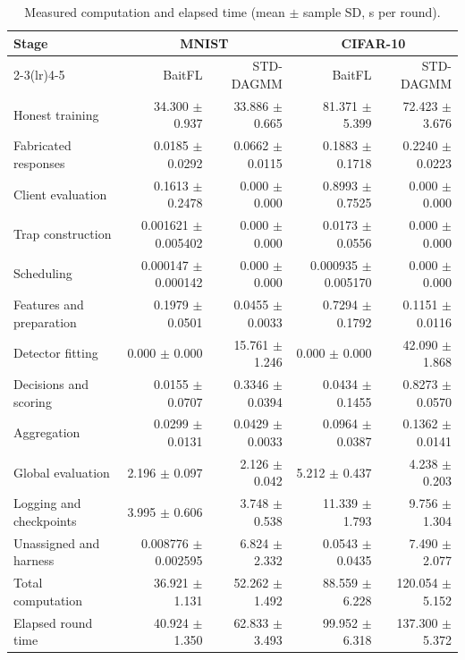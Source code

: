 \begin{table}[t]\centering\footnotesize\setlength{\tabcolsep}{5pt}
\caption{Measured computation and elapsed time (mean $\pm$ sample SD, s per round).}\label{tab:std-segments}
\begin{tabular}{lrrrr}\toprule
\multirow{2}{*}{Stage} & \multicolumn{2}{c}{MNIST} & \multicolumn{2}{c}{CIFAR-10} \\
\cmidrule(lr){2-3}\cmidrule(lr){4-5}
 & BaitFL & STD-DAGMM & BaitFL & STD-DAGMM \\ \midrule
Honest training & 34.300 $\pm$ 0.937 & 33.886 $\pm$ 0.665 & 81.371 $\pm$ 5.399 & 72.423 $\pm$ 3.676 \\
Fabricated responses & 0.0185 $\pm$ 0.0292 & 0.0662 $\pm$ 0.0115 & 0.1883 $\pm$ 0.1718 & 0.2240 $\pm$ 0.0223 \\
Client evaluation & 0.1613 $\pm$ 0.2478 & 0.000 $\pm$ 0.000 & 0.8993 $\pm$ 0.7525 & 0.000 $\pm$ 0.000 \\
Trap construction & 0.001621 $\pm$ 0.005402 & 0.000 $\pm$ 0.000 & 0.0173 $\pm$ 0.0556 & 0.000 $\pm$ 0.000 \\
Scheduling & 0.000147 $\pm$ 0.000142 & 0.000 $\pm$ 0.000 & 0.000935 $\pm$ 0.005170 & 0.000 $\pm$ 0.000 \\
Features and preparation & 0.1979 $\pm$ 0.0501 & 0.0455 $\pm$ 0.0033 & 0.7294 $\pm$ 0.1792 & 0.1151 $\pm$ 0.0116 \\
Detector fitting & 0.000 $\pm$ 0.000 & 15.761 $\pm$ 1.246 & 0.000 $\pm$ 0.000 & 42.090 $\pm$ 1.868 \\
Decisions and scoring & 0.0155 $\pm$ 0.0707 & 0.3346 $\pm$ 0.0394 & 0.0434 $\pm$ 0.1455 & 0.8273 $\pm$ 0.0570 \\
Aggregation & 0.0299 $\pm$ 0.0131 & 0.0429 $\pm$ 0.0033 & 0.0964 $\pm$ 0.0387 & 0.1362 $\pm$ 0.0141 \\
Global evaluation & 2.196 $\pm$ 0.097 & 2.126 $\pm$ 0.042 & 5.212 $\pm$ 0.437 & 4.238 $\pm$ 0.203 \\
\midrule
Logging and checkpoints & 3.995 $\pm$ 0.606 & 3.748 $\pm$ 0.538 & 11.339 $\pm$ 1.793 & 9.756 $\pm$ 1.304 \\
Unassigned and harness & 0.008776 $\pm$ 0.002595 & 6.824 $\pm$ 2.332 & 0.0543 $\pm$ 0.0435 & 7.490 $\pm$ 2.077 \\
\midrule
Total computation & 36.921 $\pm$ 1.131 & 52.262 $\pm$ 1.492 & 88.559 $\pm$ 6.228 & 120.054 $\pm$ 5.152 \\
Elapsed round time & 40.924 $\pm$ 1.350 & 62.833 $\pm$ 3.493 & 99.952 $\pm$ 6.318 & 137.300 $\pm$ 5.372 \\
\bottomrule\end{tabular}\end{table}
